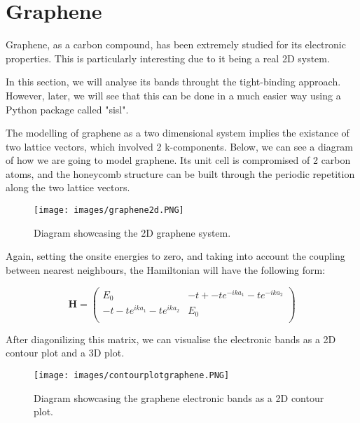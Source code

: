 \documentclass[a4paper,12pt]{report}
\begin{document}
\chapter{Graphene}

Graphene, as a carbon compound, has been extremely studied for its electronic properties. This is particularly interesting due to it being a real 2D system. 

In this section, we will analyse its bands throught the tight-binding approach. However, later, we will see that this can be done in a much easier way using a Python package called "sisl". 

The modelling of graphene as a two dimensional system implies the existance of two lattice vectors, which involved 2 k-components. Below, we can see a diagram of how we are going to model graphene. Its unit cell is compromised of 2 carbon atoms, and the honeycomb structure can be built through the periodic repetition along the two lattice vectors. 

\begin{figure}[h]
	\begin{center}
		\texttt{[image: images/graphene2d.PNG]}
	\end{center}
	\caption{Diagram showcasing the 2D graphene system.} 
	\label{fig:graphene2d}
\end{figure}


Again, setting the onsite energies to zero, and taking into account the coupling between nearest neighbours, the Hamiltonian will have the following form: 



$$        \mathbf{H} = \begin{pmatrix}
E_0 & -t + -te^{-ika_1} -te^{-ika_2}  \\
-t -te^{ika_1} -te^{ika_2} & E_0 \\
\end{pmatrix}
$$

After diagonilizing this matrix, we can visualise the electronic bands as a 2D contour plot and a 3D plot.

\begin{figure}[h]
	\begin{center}
		\texttt{[image: images/contourplotgraphene.PNG]}
	\end{center}
	\caption{Diagram showcasing the graphene electronic bands as a 2D contour plot.} 
	\label{fig:graphene2dbandscontour}
\end{figure}
\end{document}
